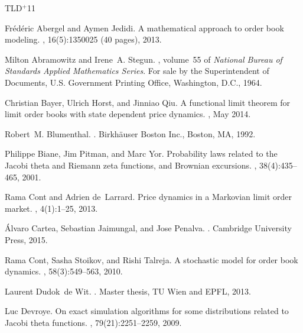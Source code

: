 \documentclass[11pt]{scrartcl}
\begin{document}
\newcommand{\etalchar}[1]{$^{#1}$}
\begin{thebibliography}{TLD{\etalchar{+}}11}

Fr{\'e}d{\'e}ric Abergel and Aymen Jedidi.
\newblock A mathematical approach to order book modeling.
,
  16(5):1350025 (40 pages), 2013.

Milton Abramowitz and Irene~A. Stegun.
, volume~55 of {\em National Bureau of Standards Applied
  Mathematics Series}.
\newblock For sale by the Superintendent of Documents, U.S. Government Printing
  Office, Washington, D.C., 1964.

Christian Bayer, Ulrich Horst, and Jinniao Qiu.
\newblock A functional limit theorem for limit order books with state dependent
  price dynamics.
, May 2014.

Robert~M. Blumenthal.
.
\newblock Birkh\"auser Boston Inc., Boston, MA, 1992.

Philippe Biane, Jim Pitman, and Marc Yor.
\newblock Probability laws related to the {J}acobi theta and {R}iemann zeta
  functions, and {B}rownian excursions.
, 38(4):435--465,
  2001.

Rama Cont and Adrien de~Larrard.
\newblock Price dynamics in a {M}arkovian limit order market.
, 4(1):1--25, 2013.

\'Alvaro Cartea, Sebastian Jaimungal, and Jose Penalva.
.
\newblock Cambridge University Press, 2015.

Rama Cont, Sasha Stoikov, and Rishi Talreja.
\newblock A stochastic model for order book dynamics.
, 58(3):549--563, 2010.

Laurent Dudok~de Wit.
.
\newblock Master thesis, TU Wien and EPFL, 2013.

Luc Devroye.
\newblock On exact simulation algorithms for some distributions related to
  {J}acobi theta functions.
, 79(21):2251--2259, 2009.


\end{thebibliography}
\end{document}

